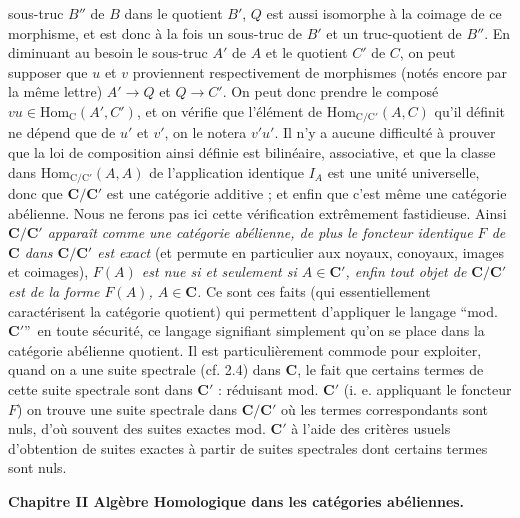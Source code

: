 
\noindent sous-truc $B''$ de $B$ dans le quotient $B'$, $Q$ est aussi
isomorphe à la coimage de ce morphisme, et est donc à la fois un sous-truc de
$B'$ et un truc-quotient de $B''$. En diminuant au besoin le sous-truc $A'$ de
$A$ et le quotient $C'$ de $C$, on peut supposer que $u$ et $v$ proviennent
respectivement de morphismes (notés encore par la même lettre)
$A'\to Q$ et $Q\to C'$. On peut donc prendre le
composé $vu\in\mathrm{Hom}_{\mathrm{C}}(A',C')$, et on vérifie que l'élément de
$\mathrm{Hom}_{\mathrm{C}/\mathrm{C}'}(A,C)$ qu'il définit ne dépend que de $u'$ et $v'$, on le
notera $v'u'$. Il n'y a aucune difficulté à prouver que la loi de composition
ainsi définie est bilinéaire, associative, et que la classe dans
$\mathrm{Hom}_{\mathrm{C}/\mathrm{C}'}(A,A)$ de l'application identique $I_A$ est une unité
universelle, donc que $\mathbf{C}/\mathbf{C}'$ est une catégorie additive ; et enfin que c'est
même une catégorie abélienne. Nous ne ferons pas ici cette vérification
extrêmement fastidieuse.
Ainsi \textit{$\mathbf{C}/\mathbf{C}'$ apparaît comme une catégorie abélienne, de plus le
foncteur identique $F$ de $\mathbf{C}$ dans $\mathbf{C}/\mathbf{C}'$ est exact} (et permute en
particulier aux noyaux, conoyaux, images et coimages), \textit{$F(A)$ est nue
si et seulement si $A\in \mathbf{C}'$, enfin tout objet de $\mathbf{C}/\mathbf{C}'$ est de la forme
$F(A)$, $A\in \mathbf{C}$.} Ce sont ces faits (qui essentiellement caractérisent la
catégorie quotient) qui permettent d'appliquer le langage
\textquotedblleft mod. $\mathbf{C}'$\textquotedblright\ en toute sécurité, ce langage
signifiant simplement qu'on se place dans la catégorie abélienne quotient.
Il est particulièrement commode pour exploiter, quand on a une suite spectrale
(cf. 2.4) dans $\mathbf{C}$, le fait que certains termes de cette suite spectrale sont
dans $\mathbf{C}'$ : réduisant mod. $\mathbf{C}'$ (i. e. appliquant le foncteur $F$) on trouve
une suite spectrale dans $\mathbf{C}/\mathbf{C}'$ où les termes correspondants sont nuls, d'où
souvent des suites exactes mod. $\mathbf{C}'$ à l'aide des critères usuels d'obtention
de suites exactes à partir de suites spectrales dont certains termes sont
nuls.

\bigskip
\begin{center}
{\normalsize\bfseries Chapitre II Algèbre Homologique dans les catégories
abéliennes.}
\end{center}

